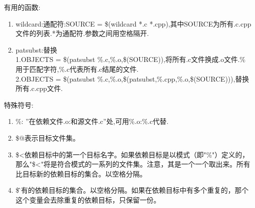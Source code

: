 \documentclass{ctexrep}
\begin{document}
\vspace{6pt}
有用的函数:
\begin{enumerate}
    \item wildcard:通配符:SOURCE = \$(wildcard *.c *.cpp),其中SOURCE为所有.c.cpp文件的列表.*为通配符.参数之间用空格隔开.
    \item patsubst:替换\\
1.OBJECTS = \$(patsubst \%.c,\%.o,\$(SOURCE)),将所有.c文件换成.o文件.\%用于匹配字符,\%.c代表所有.c结尾的文件.\\
2.OBJECTS = \$(patsubst \%.c,\%.o,\$(patsubst,\%.cpp,\%.o,\$(SOURCE))),替换所有.c.cpp文件.\\
\end{enumerate}


\vspace{6pt}
特殊符号:
\begin{enumerate}
    \item \%: ''在依赖文件.o:和源文件.c''处,可用\%.o:\%.c代替.
    \item \$@表示目标文件集。
    \item \$<依赖目标中的第一个目标名字。如果依赖目标是以模式（即"\%"）定义的，那么"\$<"将是符合模式的一系列的文件集。注意，其是一个一个取出来。所有比目标新的依赖目标的集合。以空格分隔。
    \item \$\^所有的依赖目标的集合。以空格分隔。如果在依赖目标中有多个重复的，那个这个变量会去除重复的依赖目标，只保留一份。
\end{enumerate}
\end{document}

